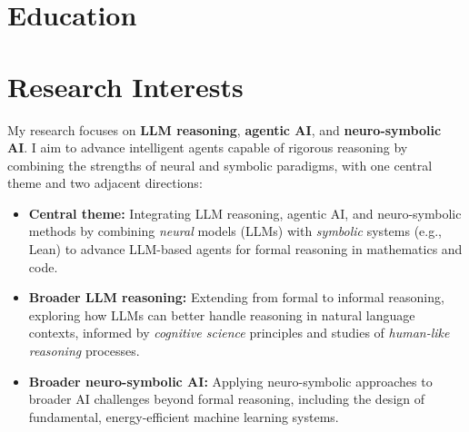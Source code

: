 \documentclass[11pt,letterpaper,sans]{moderncv}
\title{}
\begin{document}
\makecvtitle %


\section{\textbf{Education}}
\vspace{0.5em}



\section{\textbf{Research Interests}}
\vspace{0.5em}
    
My research focuses on \textbf{LLM reasoning}, \textbf{agentic AI}, and \textbf{neuro-symbolic AI}. I aim to advance intelligent agents capable of rigorous reasoning by combining the strengths of neural and symbolic paradigms, with one central theme and two adjacent directions:
\vspace{0.5em}
\begin{itemize}

  \item \textbf{Central theme:} Integrating LLM reasoning, agentic AI, and neuro-symbolic methods by combining \textit{neural} models (LLMs) with \textit{symbolic} systems (e.g., Lean) to advance LLM-based agents for formal reasoning in mathematics and code.
  \vspace{0.5em}
  \item \textbf{Broader LLM reasoning:} Extending from formal to informal reasoning, exploring how LLMs can better handle reasoning in natural language contexts, informed by \textit{cognitive science} principles and studies of \textit{human-like reasoning} processes.
  \vspace{0.5em}
  \item \textbf{Broader neuro-symbolic AI:} Applying neuro-symbolic approaches to broader AI challenges beyond formal reasoning, including the design of fundamental, energy-efficient machine learning systems.
\end{itemize}
\end{document}
